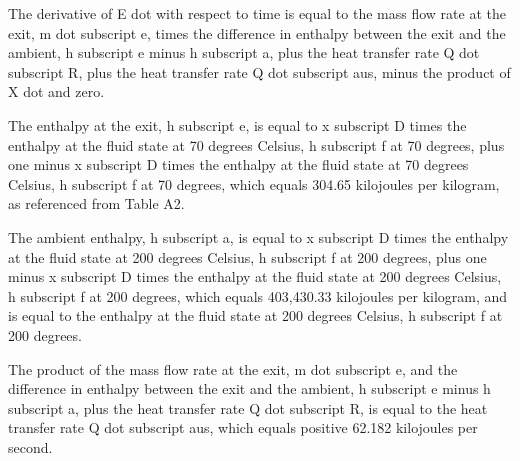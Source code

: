 The derivative of E dot with respect to time is equal to the mass flow rate at the exit, m dot subscript e, times the difference in enthalpy between the exit and the ambient, h subscript e minus h subscript a, plus the heat transfer rate Q dot subscript R, plus the heat transfer rate Q dot subscript aus, minus the product of X dot and zero.

The enthalpy at the exit, h subscript e, is equal to x subscript D times the enthalpy at the fluid state at 70 degrees Celsius, h subscript f at 70 degrees, plus one minus x subscript D times the enthalpy at the fluid state at 70 degrees Celsius, h subscript f at 70 degrees, which equals 304.65 kilojoules per kilogram, as referenced from Table A2.

The ambient enthalpy, h subscript a, is equal to x subscript D times the enthalpy at the fluid state at 200 degrees Celsius, h subscript f at 200 degrees, plus one minus x subscript D times the enthalpy at the fluid state at 200 degrees Celsius, h subscript f at 200 degrees, which equals 403,430.33 kilojoules per kilogram, and is equal to the enthalpy at the fluid state at 200 degrees Celsius, h subscript f at 200 degrees.

The product of the mass flow rate at the exit, m dot subscript e, and the difference in enthalpy between the exit and the ambient, h subscript e minus h subscript a, plus the heat transfer rate Q dot subscript R, is equal to the heat transfer rate Q dot subscript aus, which equals positive 62.182 kilojoules per second.